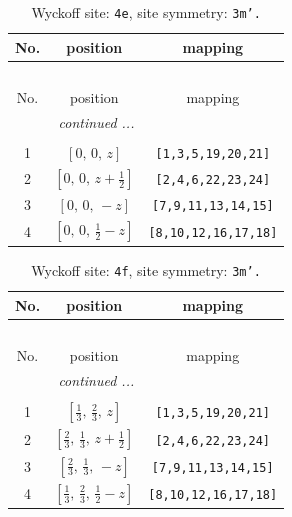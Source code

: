 \documentclass[fleqn,8pt]{jsarticle}
\begin{document}
\begin{longtable}{ccc}
\caption{Wyckoff site: {\tt 4e}, site symmetry: {\tt 3m'.}}
 \\
 \hline \hline
No. & position & mapping \\ \hline \endfirsthead

\multicolumn{2}{l}{\tablename\ \thetable{}} \\
 \hline \hline
No. & position & mapping \\ \hline \endhead

 \hline \hline
\multicolumn{2}{r}{\footnotesize\it continued ...} \\ \endfoot

 \hline \hline
\multicolumn{2}{r}{} \\ \endlastfoot

1 & $\left[ 0,\, 0,\, z \right]$ & {\tt [1,3,5,19,20,21]} \\ \hline
2 & $\left[ 0,\, 0,\, z + \frac{1}{2} \right]$ & {\tt [2,4,6,22,23,24]} \\ \hline
3 & $\left[ 0,\, 0,\, - z \right]$ & {\tt [7,9,11,13,14,15]} \\ \hline
4 & $\left[ 0,\, 0,\, \frac{1}{2} - z \right]$ & {\tt [8,10,12,16,17,18]} \\
\end{longtable}
\renewcommand{\arraystretch}{1.2}
\begin{longtable}{ccc}
\caption{Wyckoff site: {\tt 4f}, site symmetry: {\tt 3m'.}}
 \\
 \hline \hline
No. & position & mapping \\ \hline \endfirsthead

\multicolumn{2}{l}{\tablename\ \thetable{}} \\
 \hline \hline
No. & position & mapping \\ \hline \endhead

 \hline \hline
\multicolumn{2}{r}{\footnotesize\it continued ...} \\ \endfoot

 \hline \hline
\multicolumn{2}{r}{} \\ \endlastfoot

1 & $\left[ \frac{1}{3},\, \frac{2}{3},\, z \right]$ & {\tt [1,3,5,19,20,21]} \\ \hline
2 & $\left[ \frac{2}{3},\, \frac{1}{3},\, z + \frac{1}{2} \right]$ & {\tt [2,4,6,22,23,24]} \\ \hline
3 & $\left[ \frac{2}{3},\, \frac{1}{3},\, - z \right]$ & {\tt [7,9,11,13,14,15]} \\ \hline
4 & $\left[ \frac{1}{3},\, \frac{2}{3},\, \frac{1}{2} - z \right]$ & {\tt [8,10,12,16,17,18]} \\
\end{longtable}
\end{document}
